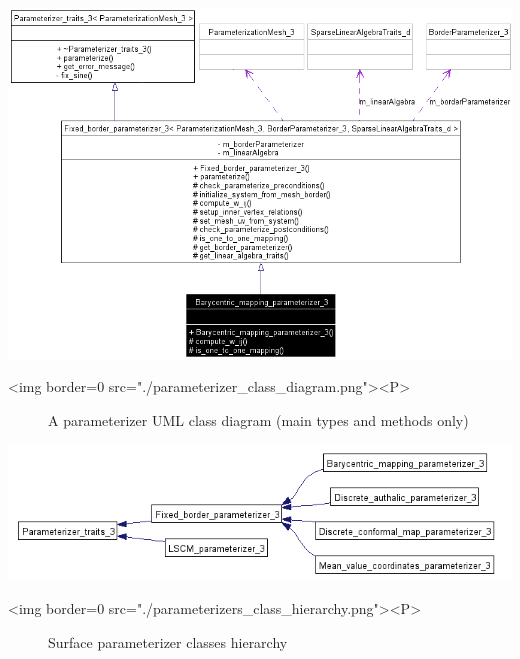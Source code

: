 \begin{center}
    \label{Surface_mesh_parameterization-fig-parameterizer_class_diagram}
    \begin{ccTexOnly}
        \includegraphics{Surface_mesh_parameterization/parameterizer_class_diagram}
    \end{ccTexOnly}
    \begin{ccHtmlOnly}
        <img border=0 src="./parameterizer_class_diagram.png"><P>
    \end{ccHtmlOnly}
    \begin{figure}[h]
        \caption{A parameterizer UML class diagram (main types and methods only)}
    \end{figure}
\end{center}

\begin{center}
    \label{Surface_mesh_parameterization-fig-parameterizers_class_hierarchy}
    \begin{ccTexOnly}
        \includegraphics{Surface_mesh_parameterization/parameterizers_class_hierarchy}
    \end{ccTexOnly}
    \begin{ccHtmlOnly}
        <img border=0 src="./parameterizers_class_hierarchy.png"><P>
    \end{ccHtmlOnly}
    \begin{figure}[h]
        \caption{Surface parameterizer classes hierarchy}
    \end{figure}
\end{center}

